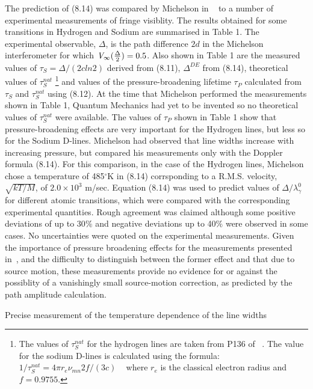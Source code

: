 \documentclass [12pt]{article}
\begin{document}
{      \par The prediction of (8.14) was compared by Michelson in ~\cite{Michelson1} to a number of experimental
   measurements of fringe visiblity. The results obtained for some transitions in Hydrogen and Sodium are 
   summarised in Table 1. The experimental observable, $\Delta$, is the path difference $2d$ in the
   Michelson interferometer for which ${\it V}_{\infty}(\frac{\Delta}{2}) = 0.5$. Also shown in
   Table 1 are the measured values of $\tau_S = \Delta/(2cln2)$ derived from (8.11), $\Delta^{DE}$ from (8.14), 
    theoretical values of $\tau_S^{nat}$
   \footnote{The values of $\tau_S^{nat}$ for the hydrogen lines are taken from P136 of ~\cite{CS}.
    The value for the sodium D-lines is calculated using the formula: $1/\tau_S^{nat} = 4 \pi r_e \nu_{mn}2 f/(3c)$
    ~\cite{Ditchburn} where $r_e$ is the classical electron radius and $f = 0.9755$.} and 
   values of the pressure-broadening lifetime $\tau_P$ calculated from  $\tau_S$ and
     $\tau_S^{nat}$ using (8.12). At the time that Michelson performed the measurements shown
    in Table 1, Quantum Mechanics had yet to be invented so no theoretical values of $\tau_S^{nat}$
    were available. The values of $\tau_P$ shown in Table 1 show that pressure-broadening effects
    are very important for the Hydrogen lines, but less so for the Sodium D-lines. Michelson had observed
   that  line widths increase with increasing pressure, but compared his measurements only with the
    Doppler formula (8.14). For this comparison, in the case of the Hydrogen lines, Michelson 
    chose a temperature of 485$^{\circ}$K in (8.14) corrsponding to a R.M.S. velocity, $\sqrt{kT/M}$,
    of $2.0 \times 10^3$ m/sec. Equation (8.14) was used to predict values of $\Delta/\lambda_{\gamma}^0$
    for different atomic transitions, which were compared with the corresponding experimental quantities.
    Rough agreement was claimed although some positive deviations of up to 30$\%$ and negative 
    deviations up to 40$\%$ were observed in some cases. No uncertainties were quoted on the
   experimental measurements. Given the importance of
   pressure broadening effects for the measurements presented in~\cite{Michelson1}, and the
    difficulty to distinguish between the former effect and that due to source motion,
    these measurements provide no evidence for or against the possiblity of a vanishingly small
    source-motion correction, as predicted by the path amplitude calculation.  
  \par Precise measurement of the temperature dependence of the line widths
}
\end{document}
